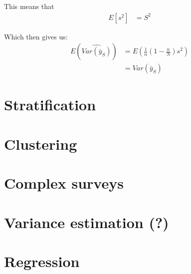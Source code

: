 \documentclass{article}
\begin{document}
This means that
\begin{align*}
 E \left[ s^2 \right] 
  &= S^2
\end{align*}

Which then gives us:
\begin{align*}
  E \left( \widehat{Var \left( \bar{y}_S \right)} \right)
  &= E \left( \frac{1}{n} \left( 1 - \frac{n}{N} \right) s^2 \right) \\
  &= Var \left( \bar{y}_S \right)
\end{align*}

\section{Stratification}

\section{Clustering}

\section{Complex surveys}

\section{Variance estimation (?)}

\section{Regression}
\end{document}
